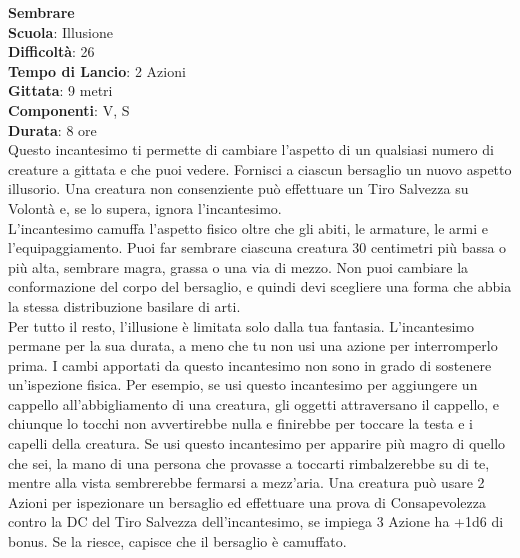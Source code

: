 \begin{multicols}{2}
\medskip\textbf{Sembrare}\\
\textbf{Scuola}: Illusione\\
\textbf{Difficoltà}: 26\\
\textbf{Tempo di Lancio}: 2 Azioni\\
\textbf{Gittata}: 9 metri\\
\textbf{Componenti}: V, S\\
\textbf{Durata}: 8 ore\\
Questo incantesimo ti permette di cambiare l'aspetto di un qualsiasi numero di creature a gittata e che puoi vedere. Fornisci a ciascun bersaglio un nuovo aspetto illusorio. Una creatura non consenziente può effettuare un Tiro Salvezza su Volontà e, se lo supera, ignora l'incantesimo.\\
L'incantesimo camuffa l'aspetto fisico oltre che gli abiti, le armature, le armi e l'equipaggiamento. Puoi far sembrare ciascuna creatura 30 centimetri più bassa o più alta, sembrare magra, grassa o una via di mezzo. Non puoi cambiare la conformazione del corpo del bersaglio, e quindi devi scegliere una forma che abbia la stessa distribuzione basilare di arti. \\
Per tutto il resto, l'illusione è limitata solo dalla tua fantasia. L'incantesimo permane per la sua durata, a meno che tu non usi una azione per interromperlo prima. I cambi apportati da questo incantesimo non sono in grado di sostenere un'ispezione fisica. Per esempio, se usi questo incantesimo per aggiungere un cappello all'abbigliamento di una creatura, gli oggetti attraversano il cappello, e chiunque lo tocchi non avvertirebbe nulla e finirebbe per toccare la testa e i capelli della creatura.
Se usi questo incantesimo per apparire più magro di quello che sei, la mano di una persona che provasse a toccarti rimbalzerebbe su di te, mentre alla vista sembrerebbe fermarsi a mezz'aria. Una creatura può usare 2 Azioni per ispezionare un bersaglio ed effettuare una prova di Consapevolezza contro la DC del Tiro Salvezza dell'incantesimo, se impiega 3 Azione ha +1d6 di bonus. Se la riesce, capisce che il bersaglio è camuffato.


\end{multicols}
